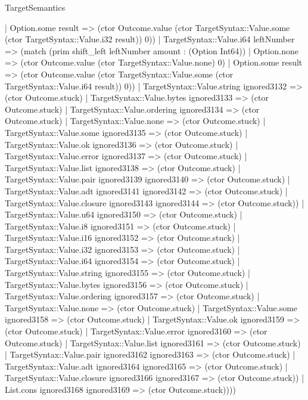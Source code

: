 \begin{lexlean}{TargetSemantics}
\begin{semanticmodule}
{                | Option.some result => (ctor Outcome.value (ctor TargetSyntax::Value.some (ctor TargetSyntax::Value.i32 result)) 0))
              | TargetSyntax::Value.i64 leftNumber => (match (prim shift_left leftNumber amount : (Option Int64))
                | Option.none => (ctor Outcome.value (ctor TargetSyntax::Value.none) 0)
                | Option.some result => (ctor Outcome.value (ctor TargetSyntax::Value.some (ctor TargetSyntax::Value.i64 result)) 0))
              | TargetSyntax::Value.string ignored3132 => (ctor Outcome.stuck)
              | TargetSyntax::Value.bytes ignored3133 => (ctor Outcome.stuck)
              | TargetSyntax::Value.ordering ignored3134 => (ctor Outcome.stuck)
              | TargetSyntax::Value.none => (ctor Outcome.stuck)
              | TargetSyntax::Value.some ignored3135 => (ctor Outcome.stuck)
              | TargetSyntax::Value.ok ignored3136 => (ctor Outcome.stuck)
              | TargetSyntax::Value.error ignored3137 => (ctor Outcome.stuck)
              | TargetSyntax::Value.list ignored3138 => (ctor Outcome.stuck)
              | TargetSyntax::Value.pair ignored3139 ignored3140 => (ctor Outcome.stuck)
              | TargetSyntax::Value.adt ignored3141 ignored3142 => (ctor Outcome.stuck)
              | TargetSyntax::Value.closure ignored3143 ignored3144 => (ctor Outcome.stuck))
            | TargetSyntax::Value.u64 ignored3150 => (ctor Outcome.stuck)
            | TargetSyntax::Value.i8 ignored3151 => (ctor Outcome.stuck)
            | TargetSyntax::Value.i16 ignored3152 => (ctor Outcome.stuck)
            | TargetSyntax::Value.i32 ignored3153 => (ctor Outcome.stuck)
            | TargetSyntax::Value.i64 ignored3154 => (ctor Outcome.stuck)
            | TargetSyntax::Value.string ignored3155 => (ctor Outcome.stuck)
            | TargetSyntax::Value.bytes ignored3156 => (ctor Outcome.stuck)
            | TargetSyntax::Value.ordering ignored3157 => (ctor Outcome.stuck)
            | TargetSyntax::Value.none => (ctor Outcome.stuck)
            | TargetSyntax::Value.some ignored3158 => (ctor Outcome.stuck)
            | TargetSyntax::Value.ok ignored3159 => (ctor Outcome.stuck)
            | TargetSyntax::Value.error ignored3160 => (ctor Outcome.stuck)
            | TargetSyntax::Value.list ignored3161 => (ctor Outcome.stuck)
            | TargetSyntax::Value.pair ignored3162 ignored3163 => (ctor Outcome.stuck)
            | TargetSyntax::Value.adt ignored3164 ignored3165 => (ctor Outcome.stuck)
            | TargetSyntax::Value.closure ignored3166 ignored3167 => (ctor Outcome.stuck))
          | List.cons ignored3168 ignored3169 => (ctor Outcome.stuck))))
}
\end{semanticmodule}
\end{lexlean}
